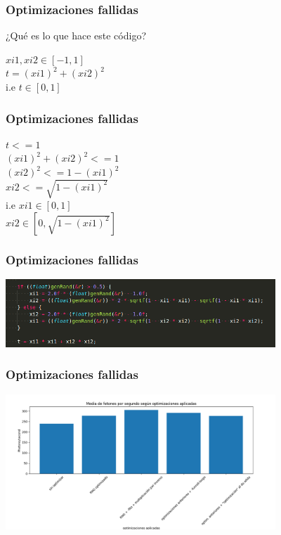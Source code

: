\documentclass{beamer}
\begin{document}
\begin{frame}
    \frametitle{Optimizaciones fallidas}
    ¿Qué es lo que hace este código? \\ \pause
    \begin{center}
        $xi1, xi2  \in [-1, 1] $ \\ \pause
        $t = (xi1)^2 + (xi2)^2$ \\ \pause
        i.e $ t \in [0,1]$
    
    \end{center}

\end{frame}


\begin{frame}
    \frametitle{Optimizaciones fallidas}
    \begin{center}
        $ t <= 1 $ \\\pause
        $(xi1)^2 + (xi2)^2 <= 1$ \\\pause
        $(xi2)^2 <= 1 - (xi1)^2$ \\\pause
        $xi2 <= \sqrt{1 - (xi1)^2}$\\\pause
        i.e $xi1 \in [0, 1]$\\
        $xi2 \in [0, \sqrt{1 - (xi1)^2}]$    

    \end{center}

\end{frame}

\begin{frame}
    \frametitle{Optimizaciones fallidas}
    \includegraphics[width=4in]{imagenes/codigo_malt_optimizado.png}
\end{frame}

\begin{frame}
    \frametitle{Optimizaciones fallidas}
    \includegraphics[width=4in]{imagenes/fallida2.png}    
\end{frame}
\end{document}
